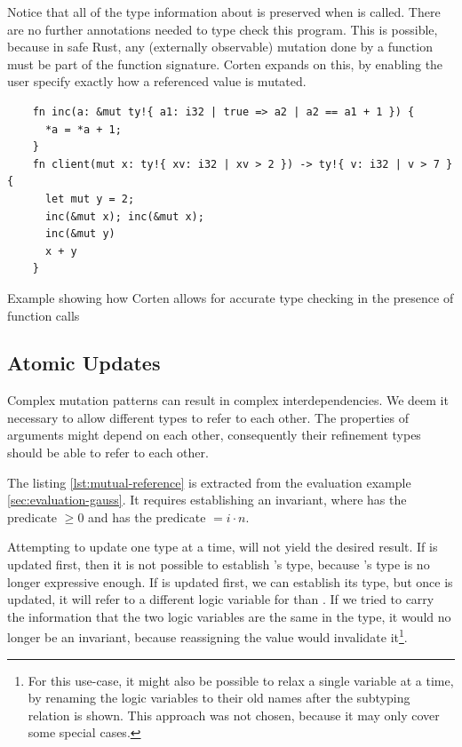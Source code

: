 \documentclass[twoside, english]{sdqthesis}
\theoremstyle{definition}
\begin{document}
Notice that all of the type information about  is preserved when  is called. There are no further annotations needed to type check this program. This is possible, because in safe Rust, any (externally observable) mutation done by a function must be part of the function signature. Corten expands on this, by enabling the user specify exactly how a referenced value is mutated.

\begin{listing}[h]
  \begin{verbatim}
    fn inc(a: &mut ty!{ a1: i32 | true => a2 | a2 == a1 + 1 }) {
      *a = *a + 1;
    }
    fn client(mut x: ty!{ xv: i32 | xv > 2 }) -> ty!{ v: i32 | v > 7 } {
      let mut y = 2;
      inc(&mut x); inc(&mut x);
      inc(&mut y)
      x + y
    }
  \end{verbatim}
  \caption{Example showing how Corten allows for accurate type checking in the presence of function calls }
  \label{lst:modular-calls}
\end{listing}


\subsection{Atomic Updates}\label{subsec:atomic-updates}

Complex mutation patterns can result in complex interdependencies. We deem it necessary to allow different types to refer to each other. 
The properties of arguments might depend on each other, consequently their refinement types should be able to refer to each other.

The listing \ref{lst:mutual-reference} is extracted from the evaluation example \ref{sec:evaluation-gauss}. It requires establishing an invariant, where  has the predicate $\geq 0$ and  has the predicate $= i \cdot n$.

Attempting to update one type at a time, will not yield the desired result. If  is updated first, then it is not possible to establish 's type, because 's type is no longer expressive enough.
If  is updated first, we can establish its type, but once  is updated, it will refer to a different logic variable for  than . If we tried to carry the information that the two logic variables are the same in the type, it would no longer be an invariant, because reassigning the value would invalidate it\footnote{
  For this use-case, it might also be possible to relax a single variable at a time, by renaming the logic variables to their old names after the subtyping relation is shown. This approach was not chosen, because it may only cover some special cases.
}.
\end{document}
